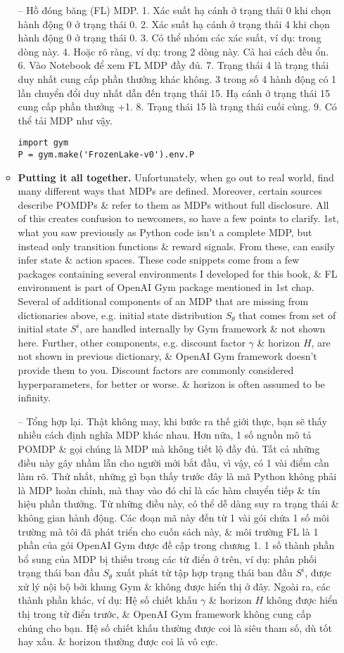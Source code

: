 \documentclass{article}
\begin{document}
\begin{itemize}
\begin{itemize}
        -- {\sf Hồ đóng băng (FL) MDP.} 1. Xác suất hạ cánh ở trạng thái 0 khi chọn hành động 0 ở trạng thái 0. 2. Xác suất hạ cánh ở trạng thái 4 khi chọn hành động 0 ở trạng thái 0. 3. Có thể nhóm các xác suất, ví dụ: trong dòng này. 4. Hoặc rõ ràng, ví dụ: trong 2 dòng này. Cả hai cách đều ổn. 6. Vào Notebook để xem FL MDP đầy đủ. 7. Trạng thái 4 là trạng thái duy nhất cung cấp phần thưởng khác không. 3 trong số 4 hành động có 1 lần chuyển đổi duy nhất dẫn đến trạng thái 15. Hạ cánh ở trạng thái 15 cung cấp phần thưởng +1. 8. Trạng thái 15 là trạng thái cuối cùng. 9. Có thể tải MDP như vậy.
        \begin{verbatim}
import gym
P = gym.make('FrozenLake-v0').env.P
        \end{verbatim}
        \item {\bf Putting it all together.} Unfortunately, when go out to real world, find many different ways that MDPs are defined. Moreover, certain sources describe POMDPs \& refer to them as MDPs without full disclosure. All of this creates confusion to newcomers, so have a few points to clarify. 1st, what you saw previously as Python code isn't a complete MDP, but instead only transition functions \& reward signals. From these, can easily infer state \& action spaces. These code snippets come from a few packages containing several environments I developed for this book, \& FL environment is part of OpenAI Gym package mentioned in 1st chap. Several of additional components of an MDP that are missing from dictionaries above, e.g. initial state distribution $S_\theta$ that comes from set of initial state $S^i$, are handled internally by Gym framework \& not shown here. Further, other components, e.g. discount factor $\gamma$ \& horizon $H$, are not shown in previous dictionary, \& OpenAI Gym framework doesn't provide them to you. Discount factors are commonly considered hyperparameters, for better or worse. \& horizon is often assumed to be infinity.

        -- {\sf Tổng hợp lại.} Thật không may, khi bước ra thế giới thực, bạn sẽ thấy nhiều cách định nghĩa MDP khác nhau. Hơn nữa, 1 số nguồn mô tả POMDP \& gọi chúng là MDP mà không tiết lộ đầy đủ. Tất cả những điều này gây nhầm lẫn cho người mới bắt đầu, vì vậy, có 1 vài điểm cần làm rõ. Thứ nhất, những gì bạn thấy trước đây là mã Python không phải là MDP hoàn chỉnh, mà thay vào đó chỉ là các hàm chuyển tiếp \& tín hiệu phần thưởng. Từ những điều này, có thể dễ dàng suy ra trạng thái \& không gian hành động. Các đoạn mã này đến từ 1 vài gói chứa 1 số môi trường mà tôi đã phát triển cho cuốn sách này, \& môi trường FL là 1 phần của gói OpenAI Gym được đề cập trong chương 1. 1 số thành phần bổ sung của MDP bị thiếu trong các từ điển ở trên, ví dụ: phân phối trạng thái ban đầu $S_\theta$ xuất phát từ tập hợp trạng thái ban đầu $S^i$, được xử lý nội bộ bởi khung Gym \& không được hiển thị ở đây. Ngoài ra, các thành phần khác, ví dụ: Hệ số chiết khấu $\gamma$ \& horizon $H$ không được hiển thị trong từ điển trước, \& OpenAI Gym framework không cung cấp chúng cho bạn. Hệ số chiết khấu thường được coi là siêu tham số, dù tốt hay xấu. \& horizon thường được coi là vô cực.


\end{itemize}
\end{itemize}
\end{document}
